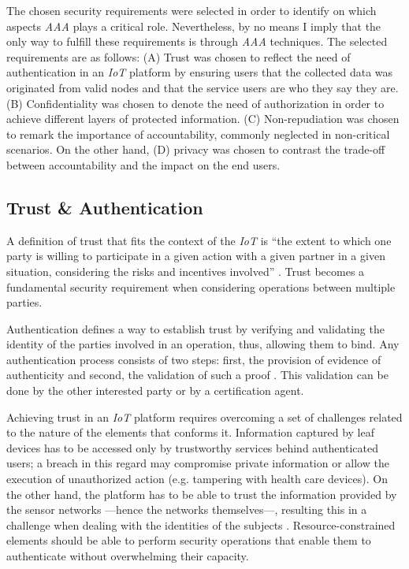 \documentclass[journal]{IEEEtran}
\begin{document}
  The chosen security requirements were selected in order to identify on which aspects \emph{AAA} plays a critical role. Nevertheless, by no means I imply that the only way to fulfill these requirements is through \emph{AAA} techniques. The selected requirements are as follows: (A) Trust was chosen to reflect the need of authentication in an \emph{IoT} platform by ensuring users that the collected data was originated from valid nodes and that the service users are who they say they are. (B) Confidentiality was chosen to denote the need of authorization in order to achieve different layers of protected information. (C) Non-repudiation was chosen to remark the importance of accountability, commonly neglected in non-critical scenarios. On the other hand, (D) privacy was chosen to contrast the trade-off between accountability and the impact on the end users.

  \subsection{Trust \& Authentication}
  A definition of trust that fits the context of the \emph{IoT} is ``the extent to which one party is willing to participate in a given action with a given partner in a given situation, considering the risks and incentives involved'' \cite{Ruohomaa2006}. Trust becomes a fundamental security requirement when considering operations between multiple parties.

  Authentication defines a way to establish trust by verifying and validating the identity of the parties involved in an operation, thus, allowing them to bind. Any authentication process consists of two steps: first, the provision of evidence of authenticity and second, the validation of such a proof \cite{Sklavos2007}. This validation can be done by the other interested party or by a certification agent.

  Achieving trust in an \emph{IoT} platform requires overcoming a set of challenges related to the nature of the elements that conforms it. Information captured by leaf devices has to be accessed only by trustworthy services behind authenticated users; a breach in this regard may compromise private information or allow the execution of unauthorized action (e.g. tampering with health care devices). On the other hand, the platform has to be able to trust the information provided by the sensor networks ---hence the networks themselves---, resulting this in a challenge when dealing with the identities of the subjects \cite{Kanuparthi2013}. Resource-constrained elements should be able to perform security operations that enable them to authenticate without overwhelming their capacity. 
\end{document}
